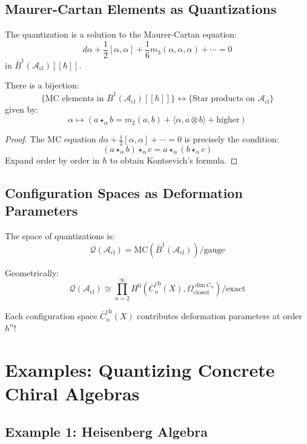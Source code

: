 \subsection{Maurer-Cartan Elements as Quantizations}

The quantization is a solution to the Maurer-Cartan equation:
$$d\alpha + \frac{1}{2}[\alpha, \alpha] + \frac{1}{6}m_3(\alpha, \alpha, \alpha) + \cdots = 0$$
in $\bar{B}^1(\mathcal{A}_{\text{cl}})[[\hbar]]$.

\begin{proposition}
There is a bijection:
$$\{\text{MC elements in } \bar{B}^1(\mathcal{A}_{\text{cl}})[[\hbar]]\} \longleftrightarrow \{\text{Star products on } \mathcal{A}_{\text{cl}}\}$$
given by:
$$\alpha \mapsto (a \star_\alpha b = m_2(a,b) + \langle \alpha, a \otimes b \rangle + \text{higher})$$
\end{proposition}

\begin{proof}
The MC equation $d\alpha + \frac{1}{2}[\alpha,\alpha] + \cdots = 0$ is precisely the condition:
$$(a \star_\alpha b) \star_\alpha c = a \star_\alpha (b \star_\alpha c)$$
Expand order by order in $\hbar$ to obtain Kontsevich's formula.
\end{proof}

\subsection{Configuration Spaces as Deformation Parameters}

The space of quantizations is:
$$\mathcal{Q}(\mathcal{A}_{\text{cl}}) = \text{MC}(\bar{B}^1(\mathcal{A}_{\text{cl}}))/\text{gauge}$$

Geometrically:
$$\mathcal{Q}(\mathcal{A}_{\text{cl}}) \cong \prod_{n=2}^\infty H^0(\overline{C}_n^{\text{ch}}(X), \Omega^{\dim C_n}_{\text{closed}})/\text{exact}$$

Each configuration space $\overline{C}_n^{\text{ch}}(X)$ contributes deformation parameters at order $\hbar^n$!

\section{Examples: Quantizing Concrete Chiral Algebras}

\subsection{Example 1: Heisenberg Algebra}

